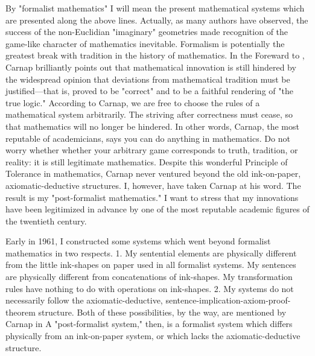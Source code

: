 By "formalist mathematics" I will mean the present mathematical 
systems which are presented along the above lines. Actually, as many authors 
have observed, the success of the non-Euclidian "imaginary" geometries 
made recognition of the game-like character of mathematics inevitable. 
Formalism is potentially the greatest break with tradition in the history of 
mathematics. In the Foreward to , Carnap 
brilliantly points out that mathematical innovation is still hindered by the 
widespread opinion that deviations from mathematical tradition must be 
justified---that is, proved to be "correct" and to be a faithful rendering of 
"the true logic." According to Carnap, we are free to choose the rules of a 
mathematical system arbitrarily. The striving after correctness must cease, so 
that mathematics will no longer be hindered.  In other words, Carnap, the most reputable 
of academicians, says you can do anything in mathematics. Do not worry 
whether whether your arbitrary game corresponds to truth, tradition, or 
reality: it is still legitimate mathematics. Despite this wonderful Principle of 
Tolerance in mathematics, Carnap never ventured beyond the old 
ink-on-paper, axiomatic-deductive structures. I, however, have taken Carnap 
at his word. The result is my "post-formalist mathematics." I want to stress 
that my innovations have been legitimized in advance by one of the most 
reputable academic figures of the twentieth century. 

Early in 1961, I constructed some systems which went beyond 
formalist mathematics in two respects. 1. My sentential elements are 
physically different from the little ink-shapes on paper used in all formalist 
systems. My sentences are physically different from concatenations of 
ink-shapes. My transformation rules have nothing to do with operations on 
ink-shapes. 2. My systems do not necessarily follow the axiomatic-deductive, 
sentence-implication-axiom-proof-theorem structure. Both of these 
possibilities, by the way, are mentioned by Carnap in  A "post-formalist system," then, is a formalist system which differs 
physically from an ink-on-paper system, or which lacks the 
axiomatic-deductive structure. 

